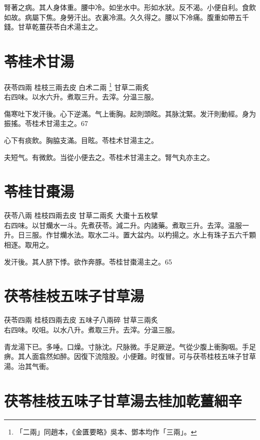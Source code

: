 腎著之病。其人身体重。腰中冷。如坐水中。形如水狀。反不渴。小便自利。食飲如故。病屬下焦。身勞汗出。衣裏冷濕。久久得之。腰以下冷痛。腹重如帶五千錢。甘草乾薑茯苓白术湯主之。

\section{苓桂术甘湯}

茯苓{\scriptsize 四兩} 桂枝{\scriptsize 三兩去皮} 白术{\scriptsize 二兩
	\footnote{
		「二兩」同趙本，《金匱要略》吳本、鄧本均作「三兩」。
	}
} 甘草{\scriptsize 二兩炙}\\
右四味。以水六升。煮取三升。去滓。分温三服。

傷寒吐下发汗後。心下逆滿。气上衝胸。起則頭眩。其脉沈緊。发汗則動經。身为振搖。苓桂术甘湯主之。67

心下有痰飲。胸脇支滿。目眩。苓桂术甘湯主之。

夫短气。有微飲。当從小便去之。苓桂术甘湯主之。腎气丸亦主之。

\section{苓桂甘棗湯}

茯苓{\scriptsize 八兩} 桂枝{\scriptsize 四兩去皮} 甘草{\scriptsize 二兩炙} 大棗{\scriptsize 十五枚擘}\\
右四味。以甘爤水一斗。先煮茯苓。減二升。内諸藥。煮取三升。去滓。温服一升。日三服。作甘爤水法。取水二斗。置大盆内。以杓揚之。水上有珠子五六千顆相逐。取用之。

发汗後。其人脐下悸。欲作奔豚。苓桂甘棗湯主之。65

\section{茯苓桂枝五味子甘草湯}

茯苓{\scriptsize 四兩} 桂枝{\scriptsize 四兩去皮} 五味子{\scriptsize 八兩碎} 甘草{\scriptsize 三兩炙}\\
右四味。㕮咀。以水八升。煮取三升。去滓。分温三服。

青龙湯下已。多唾。口燥。寸脉沈。尺脉微。手足厥逆。气從少腹上衝胸咽。手足痹。其人面翕然如醉。因復下流陰股。小便難。时復冒。可与茯苓桂枝五味子甘草湯。治其气衝。

\section{茯苓桂枝五味子甘草湯去桂加乾薑細辛}

